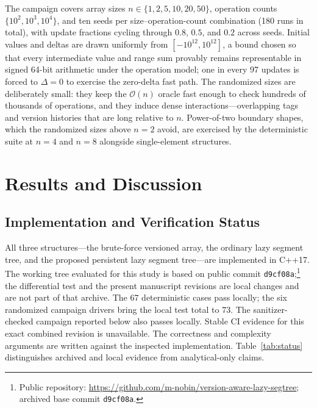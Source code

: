 \documentclass[conference]{IEEEtran}
\begin{document}
The campaign covers array sizes
$n \in \{1, 2, 5, 10, 20, 50\}$, operation counts $\{10^2, 10^3, 10^4\}$, and ten seeds per
size--operation-count combination (180 runs in total), with update fractions cycling through
$0.8$, $0.5$, and $0.2$ across seeds. Initial values and deltas
are drawn uniformly from $[-10^{12}, 10^{12}]$, a bound chosen so that every intermediate value
and range sum provably remains representable in signed 64-bit arithmetic under the operation
model; one in every 97 updates is forced to $\Delta = 0$ to exercise the zero-delta fast path.
The randomized sizes are deliberately small: they keep the $\mathcal{O}(n)$ oracle fast enough
to check hundreds of thousands of operations, and they induce dense
interactions---overlapping tags and version histories that are long relative to $n$.
Power-of-two boundary shapes, which the randomized sizes above $n = 2$ avoid, are exercised by
the deterministic suite at $n = 4$ and $n = 8$ alongside single-element structures.

\section{Results and Discussion}
\label{sec:result}

\subsection{Implementation and Verification Status}

All three structures---the brute-force versioned array, the ordinary lazy segment tree, and the
proposed persistent lazy segment tree---are implemented in C++17. The working tree evaluated for
this study is based on public commit
\texttt{d9cf08a};\footnote{Public repository:
\url{https://github.com/m-nobin/version-aware-lazy-segtree}; archived base commit
\texttt{d9cf08a}.}
the differential test and the present manuscript revisions are local changes and are not part
of that archive. The 67 deterministic cases pass locally; the six randomized campaign drivers
bring the local test total to 73. The sanitizer-checked campaign reported below
also passes locally. Stable CI evidence for this exact combined revision is unavailable.
The correctness and complexity arguments are written against the inspected implementation.
Table~\ref{tab:status} distinguishes archived and local evidence from analytical-only claims.
\end{document}
